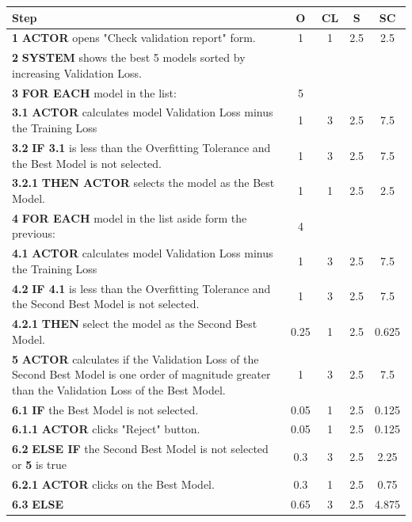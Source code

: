 \begin{table}[H]
\centering
\begin{tabularx}{\textwidth}{|X|c|c|c|c|}
\hline
\textbf{Step} & \textbf{O} & \textbf{CL} & \textbf{S} & \textbf{SC} \\
\hline
\textbf{1} \textbf{ACTOR} opens "Check validation report" form. & 1 & 1 & 2.5 & 2.5 \\
\hline
\textbf{2} \textbf{SYSTEM} shows the best 5 models sorted by increasing Validation Loss. & & & & \\
\hline
\textbf{3} \textbf{FOR EACH} model in the list: & 5 & & & \\
\hline
\textbf{3.1} \textbf{ACTOR} calculates model Validation Loss minus the Training Loss & 1 & 3 & 2.5 & 7.5 \\
\hline
\textbf{3.2} \textbf{IF 3.1} is less than the Overfitting Tolerance and the Best Model is not selected. & 1 & 3 & 2.5 & 7.5 \\
\hline
\textbf{3.2.1} \textbf{THEN ACTOR} selects the model as the Best Model. & 1 & 1 & 2.5 & 2.5 \\
\hline
\textbf{4} \textbf{FOR EACH} model in the list aside form the previous: & 4 & & & \\
\hline
\textbf{4.1} \textbf{ACTOR} calculates model Validation Loss minus the Training Loss & 1 & 3 & 2.5 & 7.5 \\
\hline
\textbf{4.2} \textbf{IF 4.1} is less than the Overfitting Tolerance and the Second Best Model is not selected. & 1 & 3 & 2.5 & 7.5 \\
\hline
\textbf{4.2.1} \textbf{THEN} select the model as the Second Best Model. & 0.25 & 1 & 2.5 & 0.625 \\
\hline
\textbf{5} \textbf{ACTOR} calculates if the Validation Loss of the Second Best Model is one order of magnitude greater than the Validation Loss of the Best Model. & 1 & 3 & 2.5 & 7.5 \\
\hline
\textbf{6.1} \textbf{IF} the Best Model is not selected. & 0.05 & 1 & 2.5 & 0.125 \\
\hline
\textbf{6.1.1} \textbf{ACTOR} clicks "Reject" button. & 0.05 & 1 & 2.5 & 0.125\\
\hline
\textbf{6.2} \textbf{ELSE IF} the Second Best Model is not selected or \textbf{5} is true & 0.3 & 3 & 2.5 & 2.25 \\
\hline
\textbf{6.2.1} \textbf{ACTOR} clicks on the Best Model. & 0.3 & 1 & 2.5 & 0.75 \\
\hline
\textbf{6.3} \textbf{ELSE} & 0.65 & 3 & 2.5 & 4.875 \\

\end{tabularx}
\end{table}
